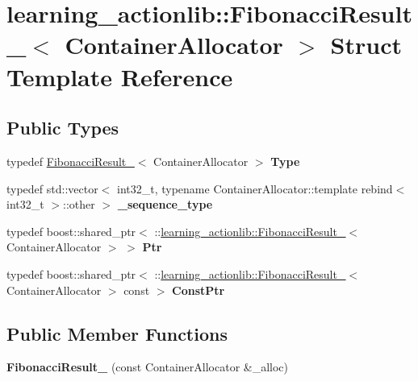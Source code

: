 \hypertarget{structlearning__actionlib_1_1FibonacciResult__}{}\section{learning\+\_\+actionlib\+:\+:Fibonacci\+Result\+\_\+$<$ Container\+Allocator $>$ Struct Template Reference}
\label{structlearning__actionlib_1_1FibonacciResult__}
\subsection*{Public Types}
\begin{DoxyCompactItemize}
\item 
\mbox{\label{structlearning__actionlib_1_1FibonacciResult___a05dd4474083f2d46a49805b41a2a7ff1}} 
typedef \hyperlink{structlearning__actionlib_1_1FibonacciResult__}{Fibonacci\+Result\+\_\+}$<$ Container\+Allocator $>$ {\bfseries Type}
\item 
\mbox{\label{structlearning__actionlib_1_1FibonacciResult___a1b36e25345b53867158b115f5eae91ae}} 
typedef std\+::vector$<$ int32\+\_\+t, typename Container\+Allocator\+::template rebind$<$ int32\+\_\+t $>$\+::other $>$ {\bfseries \+\_\+sequence\+\_\+type}
\item 
\mbox{\label{structlearning__actionlib_1_1FibonacciResult___ad07c4990d281dc58ccde73519071f871}} 
typedef boost\+::shared\+\_\+ptr$<$ \+::\hyperlink{structlearning__actionlib_1_1FibonacciResult__}{learning\+\_\+actionlib\+::\+Fibonacci\+Result\+\_\+}$<$ Container\+Allocator $>$ $>$ {\bfseries Ptr}
\item 
\mbox{\label{structlearning__actionlib_1_1FibonacciResult___a93f49204e1bbdff33a5072282f66c67b}} 
typedef boost\+::shared\+\_\+ptr$<$ \+::\hyperlink{structlearning__actionlib_1_1FibonacciResult__}{learning\+\_\+actionlib\+::\+Fibonacci\+Result\+\_\+}$<$ Container\+Allocator $>$ const  $>$ {\bfseries Const\+Ptr}
\end{DoxyCompactItemize}
\subsection*{Public Member Functions}
\begin{DoxyCompactItemize}
\item 
\mbox{\label{structlearning__actionlib_1_1FibonacciResult___a103156e8f0f3c5f2df7c338fe338d98c}} 
{\bfseries Fibonacci\+Result\+\_\+} (const Container\+Allocator \&\+\_\+alloc)
\end{DoxyCompactItemize}
